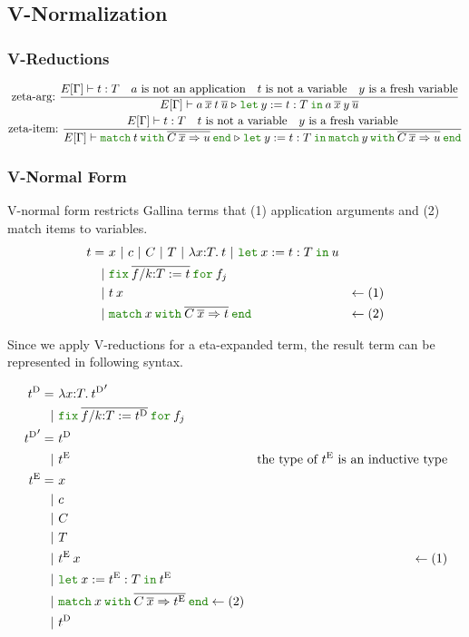 \documentclass[a4paper,fleqn]{article}
\def\gallina{\textrm{Gallina}}
\newcommand{\kwlet}{\mbox{\color{mygreen}\ttfamily let}}
\newcommand{\kwin}{\mbox{\color{mygreen}\ttfamily in}}
\newcommand{\kwmatch}{\mbox{\color{mygreen}\ttfamily match}}
\newcommand{\kwwith}{\mbox{\color{mygreen}\ttfamily with}}
\newcommand{\kwend}{\mbox{\color{mygreen}\ttfamily end}}
\newcommand{\kwfix}{\mbox{\color{mygreen}\ttfamily fix}}
\newcommand{\kwfor}{\mbox{\color{mygreen}\ttfamily for}}
\newcommand{\lamT}[3]{\lambda #1\mathord{:}#2.\:#3}
\newcommand{\letin}[3]{\kwlet\:#1:=#2\:\kwin\:#3}
\newcommand{\omatch}[2]{\kwmatch\:#1\:\kwwith\:{#2}\:\kwend}
\newcommand{\ofix}[2]{\kwfix\:{#1}\:\kwfor\:{#2}}
\newcommand{\tD}{{t^\mathrm{D}}}
\newcommand{\tE}{{t^\mathrm{E}}}
\newcommand{\reltri}{\mathrel{\triangleright}}
\begin{document}
\subsection{V-Normalization}\label{sec:v-normalization}
\subsubsection{V-Reductions}\label{sec:v-reductions}
\begin{gather*}
  \text{zeta-arg:}~
    \dfrac
    {
      E[\Gamma] \vdash t : T \quad
      \text{$a$ is not an application} \quad
      \text{$t$ is not a variable} \quad
      \text{$y$ is a fresh variable}
    }{
      E[\Gamma] \vdash
      a\:\overline{x}\:t\:\overline{u}
      \reltri
      \letin{y}{t:T}{a\:\overline{x}\:y\:\overline{u}}
    } \\
  \text{zeta-item:}~
    \dfrac
    {
      E[\Gamma] \vdash t : T \quad
      \text{$t$ is not a variable} \quad
      \text{$y$ is a fresh variable}
    }{
      E[\Gamma] \vdash
        \omatch{t}{\overline{C\:\overline{x} \Rightarrow u}}
        \reltri
        \letin{y}{t:T}{\omatch{y}{\overline{C\:\overline{x} \Rightarrow u}}}
    }
\end{gather*}

\subsubsection{V-Normal Form}\label{sec:v-normal-form}
V-normal form restricts \gallina{} terms that (1) application arguments and (2) match items to variables.
\begin{align*}
  t =&\ x~|~c~|~C~|~T~|~\lamT{x}{T}{t}~|~ \letin{x}{t:T}{u} \\
    |&\ \ofix{\overline{f/k{:}T:=t}}{f_j} \\
    |&\ t\:x                               & \leftarrow (1) \\
    |&\ \omatch{x}{\overline{C\:\overline{x} \Rightarrow t}} & \leftarrow (2)
\end{align*}

Since we apply V-reductions for a eta-expanded term,
the result term can be represented in following syntax.

\begin{align*}
  \tD =&\ \lamT{x}{T}{\tD'} \\
      |&\ \ofix{\overline{f/k{:}T:=\tD}}{f_j} \\
  \tD' =&\ \tD \\
       |&\ \tE & \text{the type of $\tE$ is an inductive type} \\
  \tE =&\ x \\
    |&\ c \\
    |&\ C \\
    |&\ T \\
    |&\ \tE\:x & \leftarrow (1) \\
    |&\ \letin{x}{\tE:T}{\tE} \\
    |&\ \omatch{x}{\overline{C\:\overline{x}\Rightarrow \tE}} \leftarrow (2) \\
    |&\ \tD \\
\end{align*}
\end{document}
